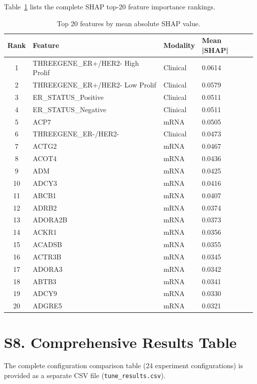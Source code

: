 \documentclass[11pt,a4paper]{article}
\begin{document}
Table~\ref{supp:tab:shap} lists the complete SHAP top-20 feature importance rankings.

\begin{table}[H]
\centering
\caption{Top 20 features by mean absolute SHAP value.}
\label{supp:tab:shap}
\begin{tabular}{clll}
\toprule
\textbf{Rank} & \textbf{Feature} & \textbf{Modality} & \textbf{Mean |SHAP|} \\
\midrule
1 & THREEGENE\_ER+/HER2- High Prolif & Clinical & 0.0614 \\
2 & THREEGENE\_ER+/HER2- Low Prolif & Clinical & 0.0579 \\
3 & ER\_STATUS\_Positive & Clinical & 0.0511 \\
4 & ER\_STATUS\_Negative & Clinical & 0.0511 \\
5 & ACP7 & mRNA & 0.0505 \\
6 & THREEGENE\_ER-/HER2- & Clinical & 0.0473 \\
7 & ACTG2 & mRNA & 0.0467 \\
8 & ACOT4 & mRNA & 0.0436 \\
9 & ADM & mRNA & 0.0425 \\
10 & ADCY3 & mRNA & 0.0416 \\
11 & ABCB1 & mRNA & 0.0407 \\
12 & ADRB2 & mRNA & 0.0374 \\
13 & ADORA2B & mRNA & 0.0373 \\
14 & ACKR1 & mRNA & 0.0356 \\
15 & ACADSB & mRNA & 0.0355 \\
16 & ACTR3B & mRNA & 0.0345 \\
17 & ADORA3 & mRNA & 0.0342 \\
18 & ABTB3 & mRNA & 0.0341 \\
19 & ADCY9 & mRNA & 0.0330 \\
20 & ADGRE5 & mRNA & 0.0321 \\
\bottomrule
\end{tabular}
\end{table}

\section*{S8. Comprehensive Results Table}
\label{supp:tune_results}

The complete configuration comparison table (24 experiment configurations) is provided as a separate CSV file (\texttt{tune\_results.csv}).
\end{document}
